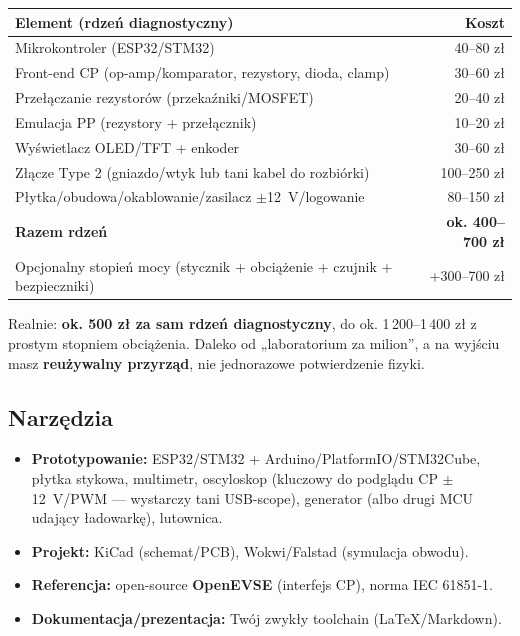 \documentclass[11pt]{article}
\begin{document}
\begin{tabularx}{\linewidth}{@{}Xr@{}}
\toprule
\textbf{Element (rdzeń diagnostyczny)} & \textbf{Koszt} \\
\midrule
Mikrokontroler (ESP32/STM32) & 40--80 zł \\
Front-end CP (op-amp/komparator, rezystory, dioda, clamp) & 30--60 zł \\
Przełączanie rezystorów (przekaźniki/MOSFET) & 20--40 zł \\
Emulacja PP (rezystory + przełącznik) & 10--20 zł \\
Wyświetlacz OLED/TFT + enkoder & 30--60 zł \\
Złącze Type 2 (gniazdo/wtyk lub tani kabel do rozbiórki) & 100--250 zł \\
Płytka/obudowa/okablowanie/zasilacz $\pm$12~V/logowanie & 80--150 zł \\
\midrule
\textbf{Razem rdzeń} & \textbf{ok. 400--700 zł} \\
\midrule
Opcjonalny stopień mocy (stycznik + obciążenie + czujnik + bezpieczniki) & +300--700 zł \\
\bottomrule
\end{tabularx}

\vspace{0.4em}
Realnie: \textbf{ok. 500 zł za sam rdzeń diagnostyczny}, do ok. 1\,200--1\,400 zł z prostym stopniem obciążenia. Daleko od „laboratorium za milion”, a na wyjściu masz \textbf{reużywalny przyrząd}, nie jednorazowe potwierdzenie fizyki.

\subsection{Narzędzia}

\begin{itemize}
  \item \textbf{Prototypowanie:} ESP32/STM32 + Arduino/PlatformIO/STM32Cube, płytka stykowa, multimetr, oscyloskop (kluczowy do podglądu CP $\pm$12~V/PWM --- wystarczy tani USB-scope), generator (albo drugi MCU udający ładowarkę), lutownica.
  \item \textbf{Projekt:} KiCad (schemat/PCB), Wokwi/Falstad (symulacja obwodu).
  \item \textbf{Referencja:} open-source \textbf{OpenEVSE} (interfejs CP), norma IEC 61851-1.
  \item \textbf{Dokumentacja/prezentacja:} Twój zwykły toolchain (LaTeX/Markdown).
\end{itemize}
\end{document}
